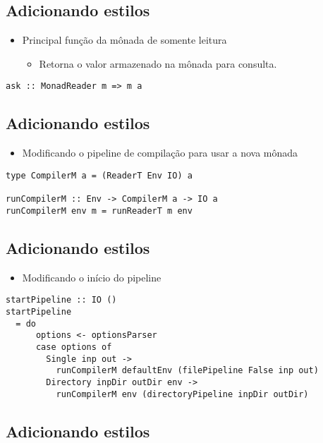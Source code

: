 \documentclass[11pt]{article}
\begin{document}
\subsection*{Adicionando estilos}
\label{sec:org188357f}

\begin{itemize}
\item Principal função da mônada de somente leitura
\begin{itemize}
\item Retorna o valor armazenado na mônada para consulta.
\end{itemize}
\end{itemize}

\begin{verbatim}
ask :: MonadReader m => m a
\end{verbatim}
\subsection*{Adicionando estilos}
\label{sec:org869b588}

\begin{itemize}
\item Modificando o pipeline de compilação para usar a nova mônada
\end{itemize}

\begin{verbatim}
type CompilerM a = (ReaderT Env IO) a

runCompilerM :: Env -> CompilerM a -> IO a
runCompilerM env m = runReaderT m env
\end{verbatim}
\subsection*{Adicionando estilos}
\label{sec:org15290e9}

\begin{itemize}
\item Modificando o início do pipeline
\end{itemize}

\begin{verbatim}
startPipeline :: IO ()
startPipeline
  = do
      options <- optionsParser
      case options of
        Single inp out ->
          runCompilerM defaultEnv (filePipeline False inp out)
        Directory inpDir outDir env ->
          runCompilerM env (directoryPipeline inpDir outDir)
\end{verbatim}
\subsection*{Adicionando estilos}
\label{sec:org190af6e}
\end{document}
